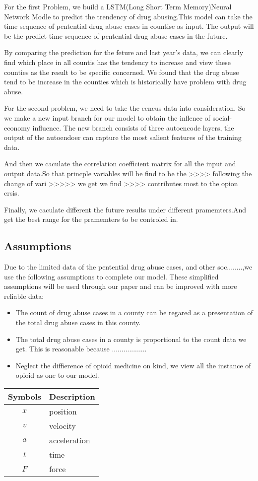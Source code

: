 \documentclass{mcmthesis}
\begin{document}
		\par For the first Problem, we build a LSTM(Long Short Term Memory)Neural Network Modle to predict the trendency of drug abusing.This model can take the time sequence of pentential drug abuse cases in countise  as input. The output will be the predict time sequence of pentential drug abuse cases in the future. 
		\par By comparing the prediction for the feture and last year's data, we can clearly find which place in all countis has the tendency to increase and view these counties as the result to be specific concerned. We found that the drug abuse tend to be increase in the counties which is historically have problem with drug abuse.
		
		\par For the second problem, we need to take the cencus data into consideration. So we make a new input branch for our model to obtain the inflence of social-economy influence. The new branch consists of three autoencode layers, the output of the autoendoer can capture the most salient features of the training data. 
		\par And then we caculate the correlation coefficient matrix for all the input and output data.So that princple variables will be find to be the >>>> following the change of vari >>>>> we get we find  >>>> contributes most to the opion crsis.
		
		\par Finally, we caculate different the future results under different pramemters.And get the best range for the pramemters to be controled in.
	\subsection{Assumptions}

		\par Due to the limited data of the pentential drug abuse cases, and other soc........,we use the 
		following assumptions to complete our model. These simplified assumptions will be used through our paper and can be improved with more reliable data:
		\begin{itemize}
			\item The count of drug abuse cases in a county can be regared as a presentation of the total drug abuse cases in this county.
			\item The total drug abuse cases in a county is proportional to the count data we get. This is reasonable because ..................
			\item Neglect the diffierence of opioid medicine on kind, we view all the instance of opioid as one to our model.  
		\end{itemize}
\begin{tabular}{cp{}} 
	\toprule
	 Symbols & Description\\
	\midrule
	 $x$ & position \\
	 $v$ & velocity \\
	 $a$ & acceleration \\
	 $t$ & time \\
	 $F$ & force\\
	\bottomrule
\end{tabular}
\end{document}
